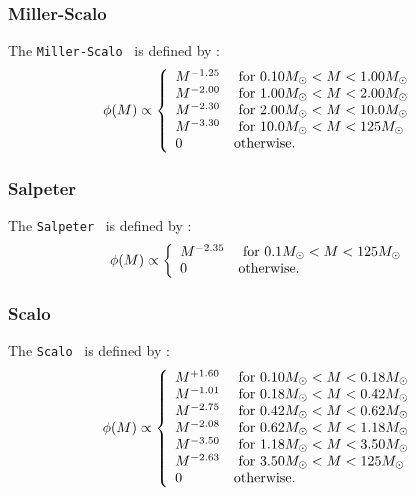 \subsubsection{Miller-Scalo}

The {\tt Miller-Scalo} \IMF\ is defined by \citep{miller_initial_1979}:
\begin{equation}
 \phi(M) \propto \left\{ \begin{array}{ll}
 M^{-1.25} & \hbox{ for } 0.10M_\odot < M < 1.00M_\odot \\
 M^{-2.00} & \hbox{ for } 1.00M_\odot < M < 2.00M_\odot \\
 M^{-2.30} & \hbox{ for } 2.00M_\odot < M < 10.0M_\odot \\
 M^{-3.30} & \hbox{ for } 10.0M_\odot < M < 125M_\odot \\
 0 & \hbox {otherwise.} \end{array} \right.
\end{equation}

\subsubsection{Salpeter}

The {\tt Salpeter} \IMF\ is defined by \citep{salpeter_luminosity_1955}:
\begin{equation}
 \phi(M) \propto \left\{ \begin{array}{ll} M^{-2.35} & \hbox{ for } 0.1M_\odot < M < 125M_\odot \\ 0 & \hbox {otherwise.} \end{array} \right.
\end{equation}

\subsubsection{Scalo}

The {\tt Scalo} \IMF\ is defined by \citep{scalo_stellar_1986}:
\begin{equation}
 \phi(M) \propto \left\{ \begin{array}{ll}
 M^{+1.60} & \hbox{ for } 0.10M_\odot < M < 0.18M_\odot \\
 M^{-1.01} & \hbox{ for } 0.18M_\odot < M < 0.42M_\odot \\
 M^{-2.75} & \hbox{ for } 0.42M_\odot < M < 0.62M_\odot \\
 M^{-2.08} & \hbox{ for } 0.62M_\odot < M < 1.18M_\odot \\
 M^{-3.50} & \hbox{ for } 1.18M_\odot < M < 3.50M_\odot \\
 M^{-2.63} & \hbox{ for } 3.50M_\odot < M < 125M_\odot \\
 0 & \hbox {otherwise.} \end{array} \right.
\end{equation}







